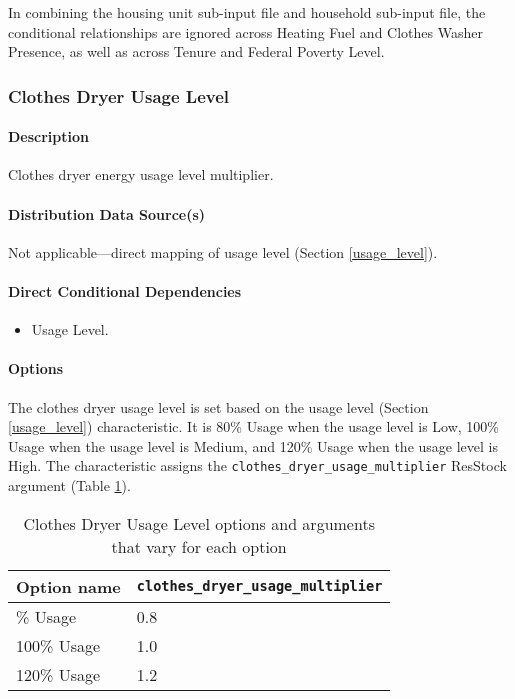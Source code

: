 In combining the housing unit sub-input file and household sub-input file, the conditional relationships are ignored across Heating Fuel and Clothes Washer Presence, as well as across Tenure and Federal Poverty Level.

\subsubsection{Clothes Dryer Usage Level}
\paragraph{Description}
Clothes dryer energy usage level multiplier.

\paragraph{Distribution Data Source(s)}
Not applicable---direct mapping of usage level (Section \ref{usage_level}).

\paragraph{Direct Conditional Dependencies}
\begin{itemize}
    \item Usage Level.
\end{itemize}

\paragraph{Options}
The clothes dryer usage level is set based on the usage level (Section \ref{usage_level}) characteristic. It is 80\% Usage when the usage level is Low, 100\% Usage when the usage level is Medium, and 120\% Usage when the usage level is High. The characteristic assigns the \texttt{clothes\_dryer\_usage\_multiplier} ResStock argument (Table \ref{table:hc_opt_clothes_dryer}).

\begin{longtable}[]{ |p{2.5cm}|p{6cm}| }
\caption{Clothes Dryer Usage Level options and arguments that vary for each option} \label{table:hc_opt_clothes_dryer} \\
\toprule\noalign{}
Option name &
\texttt{clothes\_dryer\_usage\_multiplier} \\
\midrule\noalign{}
\endhead
\bottomrule\noalign{}
\endlastfoot
80\% Usage & 0.8 \\
100\% Usage & 1.0 \\
120\% Usage & 1.2 \\
\end{longtable}


